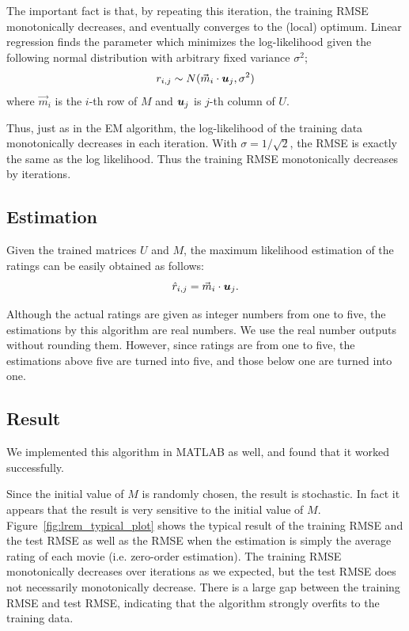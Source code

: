 \documentclass{article}
\begin{document}
The important fact is that, by repeating this iteration, the training RMSE monotonically decreases, and eventually converges to the (local) optimum. Linear regression finds the parameter which minimizes the log-likelihood given the following normal distribution with arbitrary fixed variance $\sigma^2$;
\begin{equation}
r_{i,j}\sim N(\vec{m}_i \cdot {{\mbox{\boldmath $u$}}}_j, \sigma^2)
\end{equation}
where $\vec{m}_i$ is the $i$-th row of $M$ and ${{\mbox{\boldmath $u$}}}_j$ is $j$-th column of $U$.

Thus, just as in the EM algorithm, the log-likelihood of the training data monotonically decreases in each iteration. With $\sigma = 1/\sqrt{2}$, the RMSE is exactly the same as the log likelihood. Thus the training RMSE monotonically decreases by iterations.

\subsection{Estimation}
Given the trained matrices $U$ and $M$, the maximum likelihood estimation of the ratings can be easily obtained as follows:
\begin{equation}
\hat{r}_{i,j}=\vec{m}_i \cdot {{\mbox{\boldmath $u$}}}_j.
\end{equation}

Although the actual ratings are given as integer numbers from one to five, the estimations by this algorithm are real numbers. We use the real number outputs without rounding them. However, since ratings are from one to five, the estimations above five are turned into five, and those below one are turned into one. %

\subsection{Result}

We implemented this algorithm in MATLAB as well, and found that it
worked successfully.

Since the initial value of $M$ is randomly chosen, the result is
stochastic. In fact it appears that the result is very sensitive to
the initial value of $M$. Figure~\ref{fig:lrem_typical_plot} shows the
typical result of the training RMSE and the test RMSE as well as the
RMSE when the estimation is simply the average rating of each movie
(i.e. zero-order estimation). The training RMSE monotonically
decreases over iterations as we expected, but the test RMSE does not
necessarily monotonically decrease. There is a large gap between the
training RMSE and test RMSE, indicating that the algorithm strongly
overfits to the training data.
\end{document}
